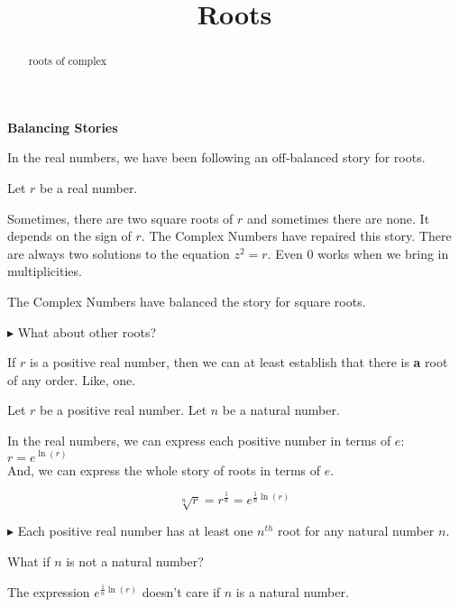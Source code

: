 \documentclass{ximera}
\title{Roots}
\begin{document}
\begin{abstract}
roots of complex
\end{abstract}
\maketitle



\textbf{Balancing Stories}

In the real numbers, we have been following an off-balanced story for roots.

Let $r$ be a real number.

Sometimes, there are two square roots of $r$ and sometimes there are none.  It depends on the sign of $r$. The Complex Numbers have repaired this story.  There are always two solutions to the equation $z^2 = r$.  Even $0$ works when we bring in multiplicities.

The Complex Numbers have balanced the story for square roots. 


\textbf{\textcolor{red!90!darkgray}{$\blacktriangleright$}} What about other roots?





If $r$ is a positive real number, then we can at least establish that there is \textbf{\textcolor{red!80!black}{a}} root of any order. Like, one.

\begin{idea}


Let $r$ be a positive real number.
Let $n$ be a natural number.



In the real numbers, we can express each positive number in terms of $e$: $r = e^{\ln(r)}$ \\


And, we can express the whole story of roots in terms of $e$.

\[
\sqrt[n]{r} = r^{\tfrac{1}{n}}= e^{\tfrac{1}{n} \ln(r)}
\]

\end{idea}





$\blacktriangleright$ Each positive real number has at least one $n^{th}$ root for any natural number $n$.


What if $n$ is not a natural number?


The expression $e^{\tfrac{1}{n} \ln(r)}$ doesn't care if $n$ is a natural number.
\end{document}

